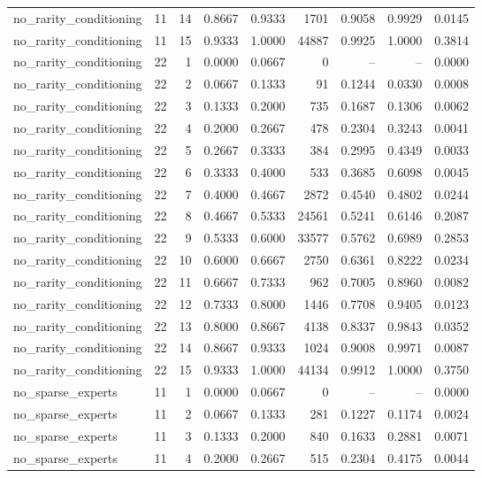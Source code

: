 \begin{tabular}{lrrrrrrrr}
no\_rarity\_conditioning & 11 & 14 & 0.8667 & 0.9333 & 1701 & 0.9058 & 0.9929 & 0.0145 \\
no\_rarity\_conditioning & 11 & 15 & 0.9333 & 1.0000 & 44887 & 0.9925 & 1.0000 & 0.3814 \\
no\_rarity\_conditioning & 22 & 1 & 0.0000 & 0.0667 & 0 & -- & -- & 0.0000 \\
no\_rarity\_conditioning & 22 & 2 & 0.0667 & 0.1333 & 91 & 0.1244 & 0.0330 & 0.0008 \\
no\_rarity\_conditioning & 22 & 3 & 0.1333 & 0.2000 & 735 & 0.1687 & 0.1306 & 0.0062 \\
no\_rarity\_conditioning & 22 & 4 & 0.2000 & 0.2667 & 478 & 0.2304 & 0.3243 & 0.0041 \\
no\_rarity\_conditioning & 22 & 5 & 0.2667 & 0.3333 & 384 & 0.2995 & 0.4349 & 0.0033 \\
no\_rarity\_conditioning & 22 & 6 & 0.3333 & 0.4000 & 533 & 0.3685 & 0.6098 & 0.0045 \\
no\_rarity\_conditioning & 22 & 7 & 0.4000 & 0.4667 & 2872 & 0.4540 & 0.4802 & 0.0244 \\
no\_rarity\_conditioning & 22 & 8 & 0.4667 & 0.5333 & 24561 & 0.5241 & 0.6146 & 0.2087 \\
no\_rarity\_conditioning & 22 & 9 & 0.5333 & 0.6000 & 33577 & 0.5762 & 0.6989 & 0.2853 \\
no\_rarity\_conditioning & 22 & 10 & 0.6000 & 0.6667 & 2750 & 0.6361 & 0.8222 & 0.0234 \\
no\_rarity\_conditioning & 22 & 11 & 0.6667 & 0.7333 & 962 & 0.7005 & 0.8960 & 0.0082 \\
no\_rarity\_conditioning & 22 & 12 & 0.7333 & 0.8000 & 1446 & 0.7708 & 0.9405 & 0.0123 \\
no\_rarity\_conditioning & 22 & 13 & 0.8000 & 0.8667 & 4138 & 0.8337 & 0.9843 & 0.0352 \\
no\_rarity\_conditioning & 22 & 14 & 0.8667 & 0.9333 & 1024 & 0.9008 & 0.9971 & 0.0087 \\
no\_rarity\_conditioning & 22 & 15 & 0.9333 & 1.0000 & 44134 & 0.9912 & 1.0000 & 0.3750 \\
no\_sparse\_experts & 11 & 1 & 0.0000 & 0.0667 & 0 & -- & -- & 0.0000 \\
no\_sparse\_experts & 11 & 2 & 0.0667 & 0.1333 & 281 & 0.1227 & 0.1174 & 0.0024 \\
no\_sparse\_experts & 11 & 3 & 0.1333 & 0.2000 & 840 & 0.1633 & 0.2881 & 0.0071 \\
no\_sparse\_experts & 11 & 4 & 0.2000 & 0.2667 & 515 & 0.2304 & 0.4175 & 0.0044 \\

\end{tabular}

